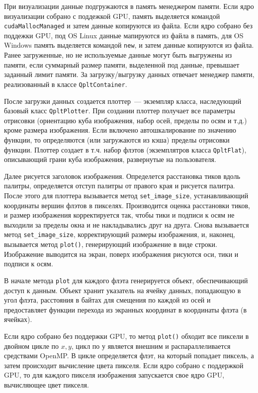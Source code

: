 \documentclass[12pt]{article}
\begin{document}
\begin{enumrate}
При визуализации данные подгружаются в память менеджером памяти. Если ядро визуализации собрано с поддежкой GPU,
память выделяется командой \verb'cudaMallocManaged' и затем данные копируются из файла. Если ядро собрано без поддежки GPU,
под OS Linux данные мапируются из файла в память, для OS Windows память выделяется командой \verb'new', и затем данные копируются из файла.
Ранее загруженные, но не используемые данные могут быть выгружены из памяти, если суммарный размер памяти, выделенной под данные, превышает заданный лимит памяти.
За загрузку/выгрузку данных отвечает менеджер памяти, реализованный в классе \verb'QpltContainer'.

После загрузки данных создается плоттер~--- экземпляр класса, наследующий базовый класс \verb'QpltPlotter'.
При создании плоттер  получает все параметры отрисовки (ориентацию куба изображения, набор осей, пределы по осям и т.д.) кроме размера изображения.
Если включено автошкалирование по значению функции, то определяются (или загружаются из кэша) пределы отрисовки функции.
Плоттер создает в т.ч. набор флэтов (экземплятров класса \verb'QpltFlat'), описывающий
грани куба изображения, развернутые на пользователя.

Далее рисуется заголовок изображения. Определется расстановка тиков вдоль палитры, определяется отступ палитры от правого края и рисуется палитра.
После этого для плоттера вызывается метод \verb'set_image_size', устанавливающий координаты вершин флэтов в пикселях.
Производится оценка расстановки тиков, и размер изображения корректируется так, чтобы тики и подписи к осям не выходили
за пределы окна и не накладывались друг на друга. Снова вызывается метод \verb'set_image_size', корректирующий размеры
изображения, и, наконец, вызывается метод \verb'plot()', генерирующий изображение в виде строки. Изображение выводится на экран,
поверх изображения рисуются оси, тики и подписи к осям.

В начале метода \verb'plot' для каждого флэта генерируется объект, обеспечивающий доступ к данным. Объект хранит указатель на ячейку данных, попадающую в угол флэта,
расстояния в байтах для смещения по каждой из осей и предоставляет функции перехода из экранных координат в координаты флэта (в ячейках).

Если ядро собрано без поддержки GPU, то метод \verb'plot()' обходит все пиксели в двойном цикле по $x, y$, цикл по $у$
является внешним и распараллеливается средствами OpenMP. В цикле определяется флэт, на который попадает пиксель, а затем происходит вычисление цвета пикселя.
Если ядро собрано  с поддержкой GPU, то для каждого пикселя изображения запускается свое ядро GPU, вычисляющее цвет пикселя.


\end{enumrate}
\end{document}
